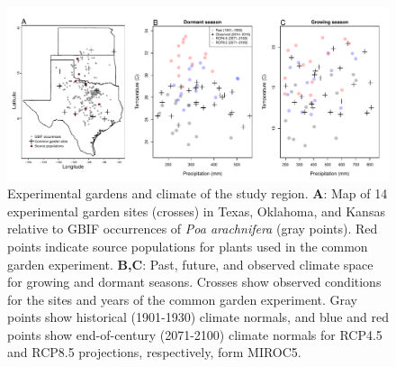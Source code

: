 \documentclass[9pt,twocolumn,twoside,lineno]{pnas-new}
\begin{document}
\begin{figure}[H]
  \begin{center}
    \includegraphics[width=1\linewidth]{tom_map_v2.pdf}
  \caption{Experimental gardens and climate of the study region. 
  	\textbf{A}: Map of 14 experimental garden sites (crosses) in Texas, Oklahoma, and Kansas relative to GBIF occurrences of \textit{Poa arachnifera} (gray points). Red points indicate source populations for plants used in the common garden experiment. 
  	\textbf{B,C}: Past, future, and observed climate space for growing and dormant seasons. Crosses show observed conditions for the sites and years of the common garden experiment. Gray points show historical (1901-1930) climate normals, and blue and red points show end-of-century (2071-2100) climate normals for RCP4.5 and RCP8.5 projections, respectively, form MIROC5. 
 }
  \label{fig:study_design}
  \end{center}
\end{figure}



\showmatmethods{} %


\showacknow{} %


\end{document}
